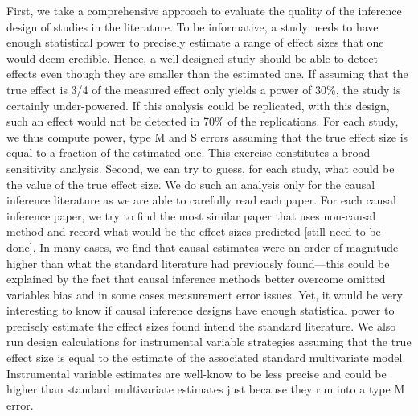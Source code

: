 \documentclass[12pt]{article}
\begin{document}
    First, we take a comprehensive approach to evaluate the quality of the inference design of studies in the literature. To be informative, a study needs to have enough statistical power to precisely estimate a range of effect sizes that one would deem credible. Hence, a well-designed study should be able to detect effects even though they are smaller than the estimated one. If assuming that the true effect is 3/4 of the measured effect only yields a power of 30\%, the study is certainly under-powered. If this analysis could be replicated, with this design, such an effect would not be detected in 70\% of the replications. %
    For each study, we thus compute power, type M and S errors assuming that the true effect size is equal to a fraction of the estimated one. This exercise constitutes a broad sensitivity analysis.  Second, we can try to guess, for each study, what could be the value of the true effect size. We do such an analysis only for the causal inference literature as we are able to carefully read each paper. For each causal inference paper, we try to find the most similar paper that uses non-causal method and record what would be the effect sizes predicted [still need to be done]. In many cases, we find that causal estimates were an order of magnitude higher than what the standard literature had previously found---this could be explained by the fact that causal inference methods better overcome omitted variables bias and in some cases measurement error issues. Yet, it would be very interesting to know if causal inference designs have enough statistical power to precisely estimate the effect sizes found intend the standard literature. We also run design calculations for instrumental variable strategies assuming that the true effect size is equal to the estimate of the associated standard multivariate model. Instrumental variable estimates are well-know to be less precise and could be higher than standard multivariate estimates just because they run into a type M error.
\end{document}
